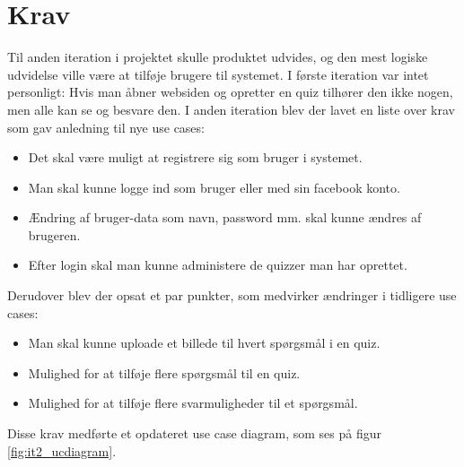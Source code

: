 \chapter{Krav}
Til anden iteration i projektet skulle produktet udvides, og den mest logiske udvidelse ville være at tilføje brugere til systemet. I første iteration var intet personligt: Hvis man åbner websiden og opretter en quiz tilhører den ikke nogen, men alle kan se og besvare den.
I anden iteration blev der lavet en liste over krav som gav anledning til nye use cases:
\begin{itemize}
\item Det skal være muligt at registrere sig som bruger i systemet.
\item Man skal kunne logge ind som bruger eller med sin facebook konto.
\item Ændring af bruger-data som navn, password mm. skal kunne ændres af brugeren.
\item Efter login skal man kunne administere de quizzer man har oprettet.
\end{itemize}

Derudover blev der opsat et par punkter, som medvirker ændringer i tidligere use cases:
\begin{itemize}
\item Man skal kunne uploade et billede til hvert spørgsmål i en quiz.
\item Mulighed for at tilføje flere spørgsmål til en quiz.
\item Mulighed for at tilføje flere svarmuligheder til et spørgsmål.
\end{itemize}

Disse krav medførte et opdateret use case diagram, som ses på figur \ref{fig:it2_ucdiagram}.

